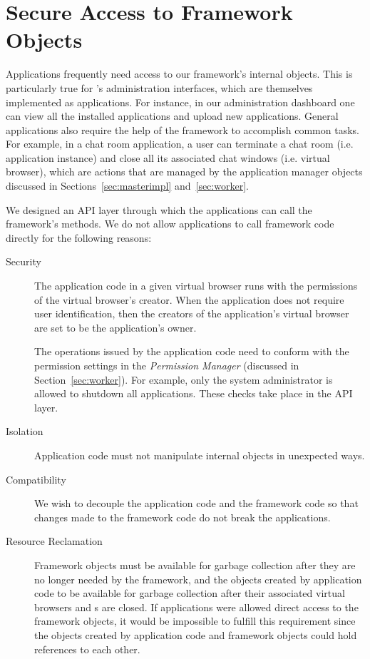 \section{Secure Access to Framework Objects}
\label{sec:api}

Applications frequently need access to our framework's internal objects. 
This is particularly true for \cb's administration interfaces, which are 
themselves implemented as \cb applications.
For instance, in our administration dashboard one can view all the installed
applications and upload new applications. General applications also
require the help of the framework to accomplish common tasks.
For example, in
a chat room application, a user can terminate a chat room (i.e. application
instance) and close all its associated chat windows (i.e. virtual browser),
which are actions that are managed by the application manager objects discussed
in Sections~\ref{sec:masterimpl} and~\ref{sec:worker}.

We designed an API layer through which the applications can call the
framework's methods.  We do not allow applications to call framework
code directly for the following reasons:

\begin{description}

\item[Security] 
The application code in a given virtual browser runs with
the permissions of the virtual browser's creator.
When the application does not require user identification, then 
the creators of the application's virtual browser are 
set to be the application's owner.

The operations issued by the application code need to conform with the 
permission settings in the \emph{Permission Manager} (discussed in
Section~\ref{sec:worker}).
For example, only the system administrator is
allowed to shutdown all applications. 
These checks take place in the API layer.


\item[Isolation]  Application code must not 
manipulate internal objects in unexpected ways. 

\item[Compatibility]  
We wish to
decouple the application code and the framework code so  that changes made to
the framework code do not break the applications.   

\item[Resource Reclamation]  
Framework objects must be available for garbage collection after they are no
longer needed by the framework,  and the objects created by application code
to be available for garbage collection after their associated virtual browsers
and \appins{}s are closed.  If applications were allowed direct access to the
framework objects,   it would be impossible to fulfill this requirement
since the objects created by application code and framework objects could hold
references to each other.

\end{description}


